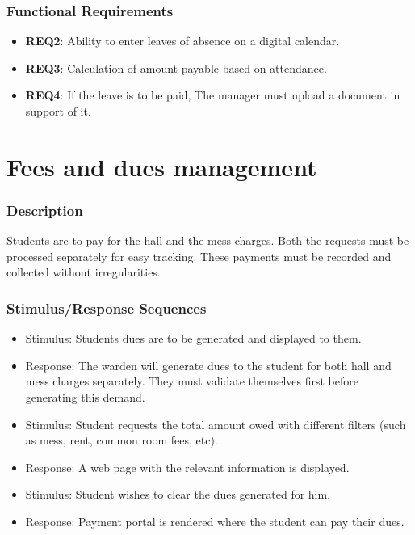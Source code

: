 \documentclass{scrreprt}
\begin{document}
\subsubsection{Functional Requirements}
\begin{itemize}
    \item \textbf{REQ2}: Ability to enter leaves of absence on a digital calendar.
    \item \textbf{REQ3}: Calculation of amount payable based on attendance.
    \item \textbf{REQ4}: If the leave is to be paid, The manager must upload a document in support of it.
\end{itemize}

\section{Fees and dues management}
\subsubsection{Description}
Students are to pay for the hall and the mess charges. Both the requests must be processed separately for easy tracking. These payments must be recorded and collected without irregularities.
\subsubsection{Stimulus/Response Sequences}
\begin{itemize}
    \item Stimulus: Students dues are to be generated and displayed to them.
    \item Response: The warden will generate dues to the student for both hall and mess charges separately. They must validate themselves first before generating this demand.
\end{itemize}

\begin{itemize}
    \item Stimulus: Student requests the total amount owed with different filters (such as mess, rent, common room fees, etc).
    \item Response: A web page with the relevant information is displayed.
\end{itemize}

\begin{itemize}
    \item Stimulus: Student wishes to clear the dues generated for him.
    \item Response: Payment portal is rendered where the student can pay their dues.
\end{itemize}
\end{document}
